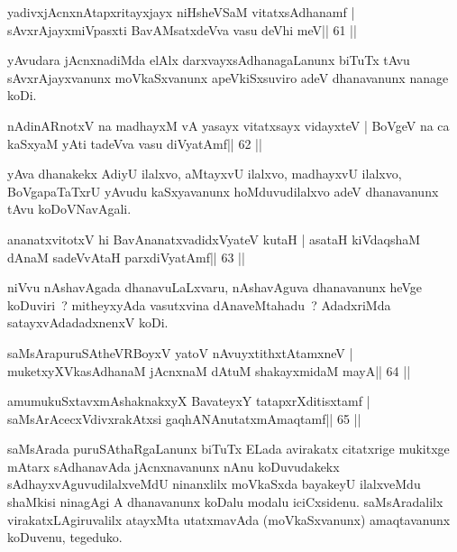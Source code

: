\begin{shl}
yadivxjAcnxnAtapxritayxjayx niHsheVSaM vitatxsAdhanamf |
sAvxrAjayxmiVpasxti BavAMsatxdeVva vasu deVhi meV\hfill || 61 ||
\end{shl}

\begin{artha}
yAvudara jAcnxnadiMda elAlx darxvayxsAdhanagaLanunx biTuTx tAvu sAvxrAjayxvanunx moVkaSxvanunx apeVkiSxsuviro adeV dhanavanunx nanage koDi.
\end{artha}

\begin{shl}
nA\s\s dinARnotxV na madhayxM vA yasayx vitatxsayx vidayxteV |
BoVgeV na ca kaSxyaM yAti tadeVva vasu diVyatAmf\hfill || 62 ||
\end{shl}

\begin{artha}
yAva dhanakekx AdiyU ilalxvo, aMtayxvU ilalxvo, madhayxvU ilalxvo, BoVgapaTaTxrU yAvudu kaSxyavanunx hoMduvudilalxvo adeV dhanavanunx tAvu koDoVNavAgali.
\end{artha}

\begin{shl}
ananatxvitotxV hi BavAnanatxvadidxVyateV kutaH |
asataH kiVdaqshaM dAnaM sadeVvAtaH parxdiVyatAmf\hfill || 63 ||
\end{shl}

\begin{artha}
niVvu nAshavAgada dhanavuLaLxvaru, nAshavAguva dhanavanunx heVge koDuviri~? mitheyxyAda vasutxvina dAnaveMtahadu~? AdadxriMda satayxvAdadadxnenxV koDi.
\end{artha}


\begin{shl}
saMsArapuruSAtheVRBoyxV yatoV nAvuyxtithxtAtamxneV |
muketxyXVkasAdhanaM jAcnxnaM dAtuM shakayxmidaM mayA\hfill || 64 ||
\end{shl}

\begin{shl}
amumukuSxtavxmAshaknakxyX BavateyxY tatapxrXditisxtamf |
saMsArAcecxVdivxrakAtx\s si gaqhANAnutatxmAmaqtamf\hfill || 65 ||
\end{shl}

\begin{artha}
saMsArada puruSAthaRgaLanunx biTuTx ELada avirakatx citatxrige
mukitxge mAtarx sAdhanavAda jAcnxnavanunx nAnu koDuvudakekx
sAdhayxvAguvudilalxveMdU ninanxlilx moVkaSxda bayakeyU ilalxveMdu
shaMkisi ninagAgi A dhanavanunx koDalu modalu
iciCxsidenu. saMsAradalilx virakatxLAgiruvalilx atayxMta utatxmavAda
(moVkaSxvanunx) amaqtavanunx koDuvenu, tegeduko.
\end{artha}

